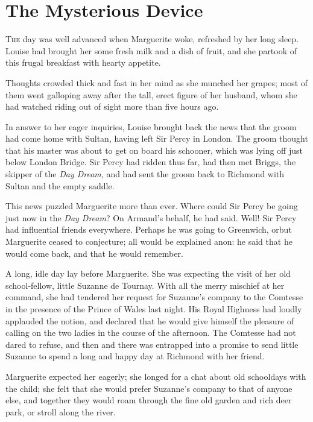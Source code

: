 
\chapter{The Mysterious Device}

\lettrine[lines=4]{T}{he} day was well advanced when Marguerite woke, refreshed by her long sleep. Louise had brought her some fresh milk and a dish of fruit, and she partook of this frugal breakfast with hearty appetite.

Thoughts crowded thick and fast in her mind as she munched her grapes; most of them went galloping away after the tall, erect figure of her husband, whom she had watched riding out of sight more than five hours ago.

In answer to her eager inquiries, Louise brought back the news that the groom had come home with Sultan, having left Sir Percy in London. The groom thought that his master was about to get on board his schooner, which was lying off just below London Bridge. Sir Percy had ridden thus far, had then met Briggs, the skipper of the \textit{Day Dream}, and had sent the groom back to Richmond with Sultan and the empty saddle.

This news puzzled Marguerite more than ever. Where could Sir Percy be going just now in the \textit{Day Dream}? On Armand's behalf, he had said. Well! Sir Percy had influential friends everywhere. Perhaps he was going to Greenwich, or\textellipsis \allowbreak  but Marguerite ceased to conjecture; all would be explained anon: he said that he would come back, and that he would remember.

A long, idle day lay before Marguerite. She was expecting the visit of her old school-fellow, little Suzanne de Tournay. With all the merry mischief at her command, she had tendered her request for Suzanne's company to the Comtesse in the presence of the Prince of Wales last night. His Royal Highness had loudly applauded the notion, and declared that he would give himself the pleasure of calling on the two ladies in the course of the afternoon. The Comtesse had not dared to refuse, and then and there was entrapped into a promise to send little Suzanne to spend a long and happy day at Richmond with her friend.

Marguerite expected her eagerly; she longed for a chat about old schooldays with the child; she felt that she would prefer Suzanne's company to that of anyone else, and together they would roam through the fine old garden and rich deer park, or stroll along the river.

